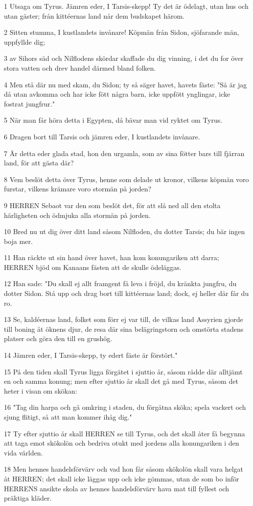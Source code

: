 \par 1 Utsaga om Tyrus. Jämren eder, I Tarsis-skepp! Ty det är ödelagt, utan hus och utan gäster; från kittéernas land når dem budskapet härom.
\par 2 Sitten stumma, I kustlandets invånare! Köpmän från Sidon, sjöfarande män, uppfyllde dig;
\par 3 av Sihors säd och Nilflodens skördar skaffade du dig vinning, i det du for över stora vatten och drev handel därmed bland folken.
\par 4 Men stå där nu med skam, du Sidon; ty så säger havet, havets fäste: "Så är jag då utan avkomma och har icke fött några barn, icke uppfött ynglingar, icke fostrat jungfrur."
\par 5 När man får höra detta i Egypten, då bävar man vid ryktet om Tyrus.
\par 6 Dragen bort till Tarsis och jämren eder, I kustlandets invånare.
\par 7 Är detta eder glada stad, hon den urgamla, som av sina fötter bars till fjärran land, för att gästa där?
\par 8 Vem beslöt detta över Tyrus, henne som delade ut kronor, vilkens köpmän voro furstar, vilkens krämare voro stormän på jorden?
\par 9 HERREN Sebaot var den som beslöt det, för att slå ned all den stolta härligheten och ödmjuka alla stormän på jorden.
\par 10 Bred nu ut dig över ditt land såsom Nilfloden, du dotter Tarsis; du bär ingen boja mer.
\par 11 Han räckte ut sin hand över havet, han kom konungariken att darra; HERREN bjöd om Kanaans fästen att de skulle ödeläggas.
\par 12 Han sade: "Du skall ej allt framgent få leva i fröjd, du kränkta jungfru, du dotter Sidon. Stå upp och drag bort till kittéernas land; dock, ej heller där får du ro.
\par 13 Se, kaldéernas land, folket som förr ej var till, de vilkas land Assyrien gjorde till boning åt öknens djur, de resa där sina belägringstorn och omstörta stadens platser och göra den till en grushög.
\par 14 Jämren eder, I Tarsis-skepp, ty edert fäste är förstört."
\par 15 På den tiden skall Tyrus ligga förgätet i sjuttio år, såsom rådde där alltjämt en och samma konung; men efter sjuttio år skall det gå med Tyrus, såsom det heter i visan om skökan:
\par 16 "Tag din harpa och gå omkring i staden, du förgätna sköka; spela vackert och sjung flitigt, så att man kommer ihåg dig."
\par 17 Ty efter sjuttio år skall HERREN se till Tyrus, och det skall åter få begynna att taga emot skökolön och bedriva otukt med jordens alla konungariken i den vida världen.
\par 18 Men hennes handelsförvärv och vad hon får såsom skökolön skall vara helgat åt HERREN; det skall icke läggas upp och icke gömmas, utan de som bo inför HERRENS ansikte skola av hennes handelsförvärv hava mat till fyllest och präktiga kläder.

